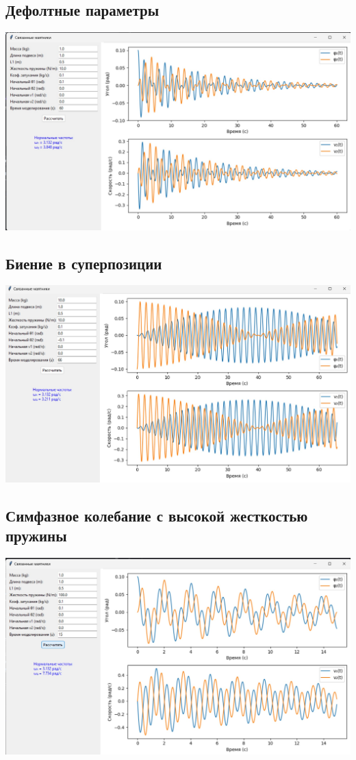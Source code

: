 \documentclass[a4paper,11pt]{article}
\theoremstyle{definition}
\begin{document}
    \subsection{Дефолтные параметры}
        \includegraphics[scale=0.5]{4. Connected pendulum/demo results/default_params}

    \subsection{Биение в суперпозиции}
        \includegraphics[scale=0.5]{4. Connected pendulum/demo results/super_position_hitting}

    \subsection{Симфазное колебание с высокой жесткостью пружины}
        \includegraphics[scale=0.5]{4. Connected pendulum/demo results/synced_high_param_K}
\end{document}
